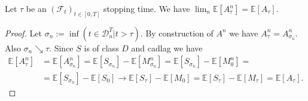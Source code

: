 \begin{lemma}\label{lem:lim_Exp_A_n_tau_is_Exp_A_tau}
  Let $\tau$ be an $(\mathcal{F}_t)_{t\in[0,T]}$ stopping time. We have $\lim_n\mathbb{E}[A^n_\tau]=\mathbb{E}[A_\tau]$.
\end{lemma}
\begin{proof}
  Let $\sigma_n:=\inf\left(t\in\mathcal{D}^T_n\vert t>\tau\right)$. By construction of $A^n$ we have $A^n_\tau=A^n_{\sigma_n}$.
  Also $\sigma_n\searrow\tau$. Since $S$ is of class $D$ and cadlag we have
  \begin{align*}
    \mathbb{E}[A^n_\tau]&=\mathbb{E}[A^n_{\sigma_n}]=\mathbb{E}[S_{\sigma_n}]-\mathbb{E}[M^n_{\sigma_n}]=\mathbb{E}[S_{\sigma_n}]-\mathbb{E}[M^n_0]=\\
    &=\mathbb{E}[S_{\sigma_n}]-\mathbb{E}[S_0]\rightarrow \mathbb{E}[S_\tau]-\mathbb{E}[M_0]=\mathbb{E}[S_\tau]-\mathbb{E}[M_\tau]=\mathbb{E}[A_\tau].
  \end{align*}
\end{proof}

